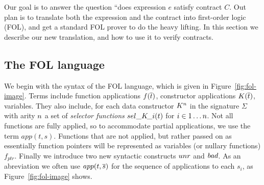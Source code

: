 Our goal is to answer the question ``does expression $e$ satisfy
contract $C$.  Out plan is to translate both the expression and the
contract into first-order logic (FOL), and get a standard FOL prover
to do the heavy lifting.  In this section we describe our new
translation, and how to use it to verify contracts.

\subsection{The FOL language}

We begin with the syntax of the FOL language, which
is given in Figure~\ref{fig:fol-image}. Terms include function 
applications $f(\overline{t})$, constructor applications $K(\overline{t})$, variables. They 
also include, for each data constructor $K^n$ in the signature $\Sigma$ with 
arity $n$ a set of {\em selector functions} $\mathop{sel\_K\!\_i}(t)$ for $i \in 1 \ldots n$.
Not all functions are fully applied, so to accommodate partial applications, we use 
the term $app(t,s)$. Functions that are not applied, but rather passed on as essentially 
function pointers will be represented as variables (or nullary functions) $f_{ptr}$. Finally 
we introduce two new syntactic constructs $\mathop{unr}$ and $\mathop{bad}$. As an abreviation we often use
$app(t,\overline{s})$ for the sequence of applications to each $s_i$, as 
Figure~\ref{fig:fol-image} shows.

